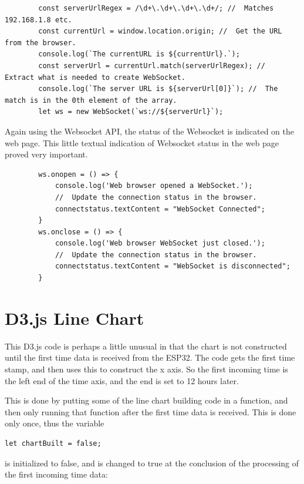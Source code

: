 \documentclass[oneside,letterpaper,12pt]{book}
\begin{document}
\begin{verbatim}
        const serverUrlRegex = /\d+\.\d+\.\d+\.\d+/; //  Matches 192.168.1.8 etc.
        const currentUrl = window.location.origin; //  Get the URL from the browser.
        console.log(`The currentURL is ${currentUrl}.`);
        const serverUrl = currentUrl.match(serverUrlRegex); //  Extract what is needed to create WebSocket.
        console.log(`The server URL is ${serverUrl[0]}`); //  The match is in the 0th element of the array.
        let ws = new WebSocket(`ws://${serverUrl}`);
\end{verbatim}

Again using the Websocket API, the status of the Websocket is indicated
on the web page. This little textual indication of Websocket status in
the web page proved very important.

\begin{verbatim}
        ws.onopen = () => {
            console.log('Web browser opened a WebSocket.');
            //  Update the connection status in the browser.
            connectstatus.textContent = "WebSocket Connected";
        }
        ws.onclose = () => {
            console.log('Web browser WebSocket just closed.');
            //  Update the connection status in the browser.
            connectstatus.textContent = "WebSocket is disconnected";
        }
\end{verbatim}

\section{D3.js Line Chart}\label{d3.js-line-chart}

This D3.js code is perhaps a little unusual in that the chart is not
constructed until the first time data is received from the ESP32. The
code gets the first time stamp, and then uses this to construct the x
axis. So the first incoming time is the left end of the time axis, and
the end is set to 12 hours later.

This is done by putting some of the line chart building code in a
function, and then only running that function after the first time data
is received. This is done only once, thus the variable

\begin{verbatim}
let chartBuilt = false;
\end{verbatim}

is initialized to false, and is changed to true at the conclusion of the
processing of the first incoming time data:
\end{document}
